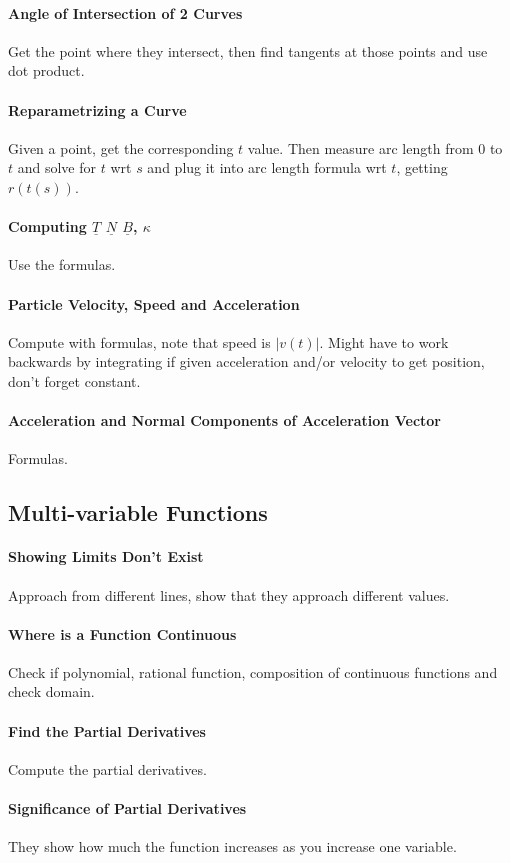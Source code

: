 \documentclass[12 pt]{article}
\theoremstyle{definition}
\begin{document}
\paragraph{Angle of Intersection of 2 Curves} Get the point where they intersect, then find tangents at those points and use dot product.
\paragraph{Reparametrizing a Curve} Given a point, get the corresponding $t$ value. Then measure arc length from $0$ to $t$ and solve for $t$ wrt $s$ and plug it into arc length formula wrt $t$, getting $r(t(s))$.
\paragraph{Computing $\underline{T}$ $\underline{N}$ $\underline{B}$, $\kappa$} Use the formulas.
\paragraph{Particle Velocity, Speed and Acceleration} Compute with formulas, note that speed is $|v(t)|$. Might have to work backwards by integrating if given acceleration and/or velocity to get position, don't forget constant.
\paragraph{Acceleration and Normal Components of Acceleration Vector} Formulas.
\subsection{Multi-variable Functions}
\paragraph{Showing Limits Don't Exist} Approach from different lines, show that they approach different values.
\paragraph{Where is a Function Continuous} Check if polynomial, rational function, composition of continuous functions and check domain.
\paragraph{Find the Partial Derivatives} Compute the partial derivatives.
\paragraph{Significance of Partial Derivatives} They show how much the function increases as you increase one variable.
\end{document}

